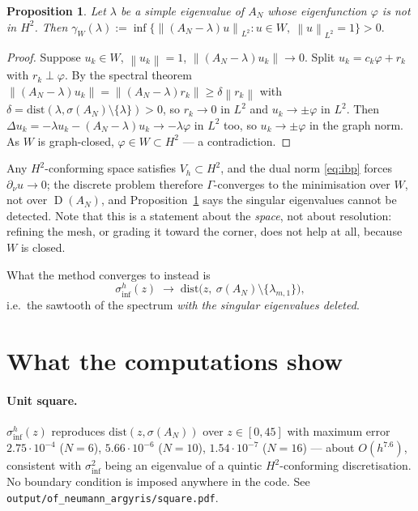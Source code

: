 \documentclass[11pt,a4paper]{article}
\newcommand{\norm}[1]{\left\|#1\right\|}
\DeclareMathOperator{\dom}{D}
\newcommand{\siginf}{\sigma_{\inf}}
\newtheorem{proposition}{Proposition}
\begin{document}
\begin{proposition}\label{prop}
Let $\lambda$ be a simple eigenvalue of $A_N$ whose eigenfunction $\varphi$ is
not in $H^2$. Then
$\gamma_W(\lambda) := \inf\{\norm{(A_N-\lambda)u}_{L^2} : u \in W,\ \norm{u}_{L^2}=1\} > 0.$
\end{proposition}
\begin{proof}
Suppose $u_k \in W$, $\norm{u_k}=1$, $\norm{(A_N-\lambda)u_k}\to 0$. Split
$u_k = c_k\varphi + r_k$ with $r_k \perp \varphi$. By the spectral theorem
$\norm{(A_N-\lambda)u_k} = \norm{(A_N-\lambda)r_k} \ge \delta\norm{r_k}$ with
$\delta = \mathrm{dist}(\lambda,\sigma(A_N)\setminus\{\lambda\}) > 0$, so
$r_k \to 0$ in $L^2$ and $u_k \to \pm\varphi$ in $L^2$. Then
$\Delta u_k = -\lambda u_k - (A_N-\lambda)u_k \to -\lambda\varphi$ in $L^2$ too,
so $u_k \to \pm\varphi$ in the graph norm. As $W$ is graph-closed,
$\varphi \in W \subset H^2$ --- a contradiction.
\end{proof}

Any $H^2$-conforming space satisfies $V_h \subset H^2$, and the dual norm
\eqref{eq:ibp} forces $\partial_\nu u \to 0$; the discrete problem therefore
$\Gamma$-converges to the minimisation over $W$, not over $\dom(A_N)$, and
Proposition~\ref{prop} says the singular eigenvalues cannot be detected. Note
that this is a statement about the \emph{space}, not about resolution:
refining the mesh, or grading it toward the corner, does not help at all,
because $W$ is closed.

What the method converges to instead is
\begin{equation}\label{eq:pred}
  \siginf^h(z) \;\longrightarrow\; \mathrm{dist}\bigl(z,\ \sigma(A_N)\setminus\{\lambda_{m,1}\}\bigr),
\end{equation}
i.e.\ the sawtooth of the spectrum \emph{with the singular eigenvalues deleted}.

\section{What the computations show}

\paragraph{Unit square.} $\siginf^h(z)$ reproduces $\mathrm{dist}(z,\sigma(A_N))$ over
$z \in [0,45]$ with maximum error $2.75\cdot10^{-4}$ ($N=6$),
$5.66\cdot10^{-6}$ ($N=10$), $1.54\cdot10^{-7}$ ($N=16$) --- about
$O(h^{7.6})$, consistent with $\siginf^2$ being an eigenvalue of a quintic
$H^2$-conforming discretisation. No boundary condition is imposed anywhere in
the code. See \texttt{output/of\_neumann\_argyris/square.pdf}.
\end{document}
